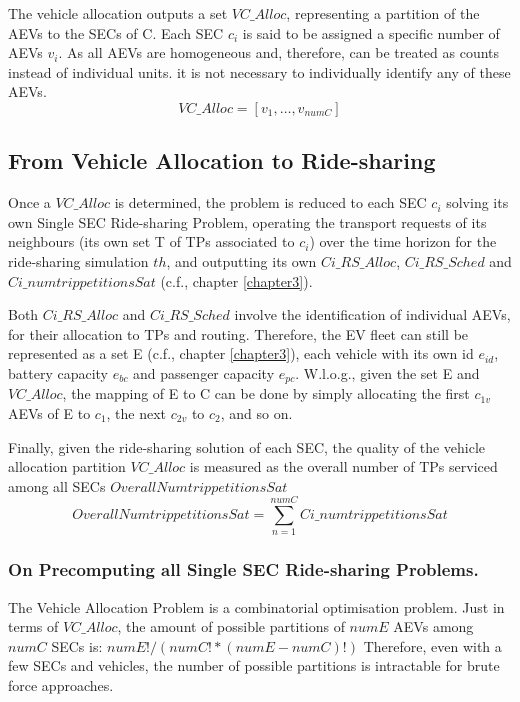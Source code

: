 The vehicle allocation outputs a set $VC\_Alloc$, representing a partition of the AEVs to the SECs of C.
Each SEC $c_i$ is said to be assigned a specific number of AEVs $v_i$.
As all AEVs are homogeneous and, therefore, can be treated as counts instead of individual  units.
it is not necessary to individually identify any of these AEVs.
\[
VC\_Alloc = [ v_1, \ldots, v_{numC} ]
\]

\subsection{From Vehicle Allocation to Ride-sharing}
\label{ccis_and_smartgreens_relationship}

Once a $VC\_Alloc$ is determined,
the problem is reduced to each SEC $c_i$ solving its own Single SEC Ride-sharing Problem,
operating the transport requests of its neighbours (its own set T of TPs associated to $c_i$) over the time horizon for the ride-sharing simulation $th$,
and outputting its own $Ci\_RS\_Alloc$, $Ci\_RS\_Sched$ and $Ci\_numtrip petitionsSat$ (c.f., chapter \ref{chapter3}).

Both $Ci\_RS\_Alloc$ and $Ci\_RS\_Sched$ involve the identification of individual AEVs, for their
allocation to TPs and routing. Therefore, the EV fleet can still be represented as a set E
(c.f., chapter \ref{chapter3}),
each vehicle with its own id $e_{id}$, battery capacity $e_{bc}$ and passenger capacity $e_{pc}$.
W.l.o.g., given the set E and $VC\_Alloc$, the mapping of E to C can be done by simply allocating the
first $c_{1v}$ AEVs of E to $c_1$, the next $c_{2v}$ to $c_2$, and so on.

Finally, given the ride-sharing solution of each SEC, the quality of the vehicle allocation
partition $VC\_Alloc$ is measured as the overall number of TPs serviced among all SECs $OverallNumtrip petitionsSat$
\[
OverallNumtrip petitionsSat = \sum_{n=1}^{numC} Ci\_numtrip petitionsSat
\]

\subsubsection{On Precomputing all Single SEC Ride-sharing Problems.}
The Vehicle Allocation Problem is a combinatorial optimisation problem.
Just in terms of $VC\_Alloc$, the amount of possible partitions of $numE$ AEVs among $numC$ SECs is:
$numE! / (numC! * (numE-numC)!)$
Therefore, even with a few SECs and vehicles, the number of possible partitions is intractable for brute force approaches.


